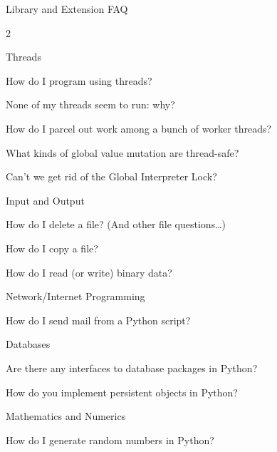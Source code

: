 \documentclass [8pt] {extarticle}
\begin{document}
    Library and Extension FAQ

        \begin {multicols} {2}

        Threads

            How do I program using threads?

            None of my threads seem to run: why?

            How do I parcel out work among a bunch of worker threads?

            What kinds of global value mutation are thread-safe?

            Can’t we get rid of the Global Interpreter Lock?

        Input and Output

            How do I delete a file? (And other file questions…)

            How do I copy a file?

            How do I read (or write) binary data?

        Network/Internet Programming

            How do I send mail from a Python script?

        Databases

            Are there any interfaces to database packages in Python?

            How do you implement persistent objects in Python?

        Mathematics and Numerics

            How do I generate random numbers in Python?

        \end {multicols}
\end{document}
